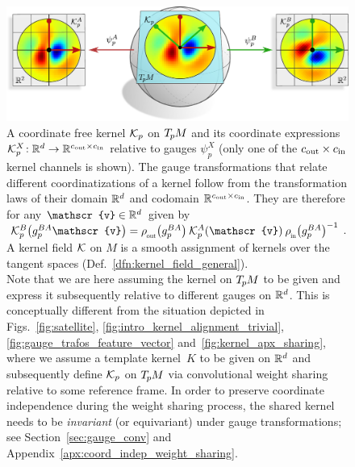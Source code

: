 \begin{figure}
    \centering
    \includegraphics[width=.9\columnwidth]{figures/kernel_coordinatization.pdf}
    \caption{\small
        A coordinate free kernel $\mathcal{K}_p$ on $T_{\mkern-1.5mu p}\mkern-.5muM$ and its coordinate expressions ${\mathcal{K}_p^X \!: \mathbb{R}^d \to \mathbb{R}^{{c_\textup{out}}\times{c_\textup{in}}}}$ relative to gauges $\psi_p^X$ (only one of the ${{c_\textup{out}} \times {c_\textup{in}}}$ kernel channels is shown).
        The gauge transformations that relate different coordinatizations of a kernel follow from the transformation laws of their domain $\mathbb{R}^d$ and codomain $\mathbb{R}^{{c_\textup{out}}\times{c_\textup{in}}}$.
        They are therefore for any $\mathscr{v} \in \R^d$ given by
        $\Kp^B\big(g_p^{BA} \mathscr{v}\big) = \rhoout\big(g_p^{BA}\big) \:\Kp^A (\mathscr{v})\: \rhoin\big(g_p^{BA}\big)^{-1}$.
        A kernel field $\mathcal{K}$ on $M$ is a smooth assignment of kernels over the tangent spaces (Def.~\ref{dfn:kernel_field_general}).
        \\
        Note that we are here assuming the kernel on $T_{\mkern-1.5mu p}\mkern-.5muM$ to be given and express it subsequently relative to different gauges on $\mathbb{R}^d$.
        This is conceptually different from the situation depicted in
        Figs.~\ref{fig:satellite}, \ref{fig:intro_kernel_alignment_trivial}, \ref{fig:gauge_trafos_feature_vector} and~\ref{fig:kernel_apx_sharing},
        where we assume a template kernel~$K$ to be given on $\mathbb{R}^d$ and subsequently define $\mathcal{K}_p$ on $T_{\mkern-1.5mu p}\mkern-.5muM$ via convolutional weight sharing relative to some reference frame.
        In order to preserve coordinate independence during the weight sharing process, the shared kernel needs to be \emph{invariant} (or equivariant) under gauge transformations; see Section~\ref{sec:gauge_conv} and Appendix~\ref{apx:coord_indep_weight_sharing}.
    }
    \label{fig:kernel_coordinatization}
\end{figure}


